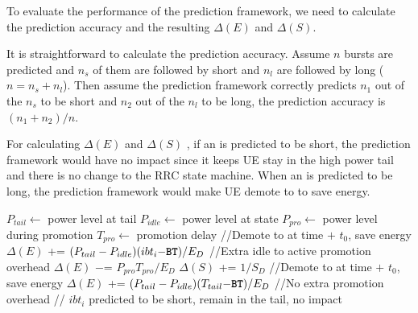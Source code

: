 \label{sec:method.eval}


To evaluate the performance of the prediction framework, we need to calculate the prediction accuracy and the resulting $\Delta(E)$ and $\Delta(S)$.

It is straightforward to calculate the prediction accuracy. Assume $n$ bursts are predicted and $n_{s}$ of them are followed by short \IBTS and $n_{l}$ are followed by long \IBTS ($n = n_{s} + n_{l}$). Then assume the prediction framework correctly predicts $n_{1}$ out of the $n_{s}$ \IBTS to be short and $n_{2}$ out of the $n_{l}$ \IBTS to be long, the prediction accuracy is $(n_{1} + n_{2}) / n$.

For calculating $\Delta(E)$ and $\Delta(S)$ , if an \IBT is predicted to be short, the prediction framework would have no impact since it keeps UE stay in the high power tail and there is no change to the RRC state machine. When an \IBT is predicted to be long, the prediction framework would make UE demote to \RI to save energy.

\begin{algorithm}[t]
\begin{algorithmic}
\STATE $P_{tail} \leftarrow $ power level at \RC tail
\STATE $P_{idle} \leftarrow $ power level at \RI state
\STATE $P_{pro} \leftarrow $ power level during promotion
\STATE $T_{pro} \leftarrow $ promotion delay
\STATE //Demote to \RI at time \BT $+$ $t_{0}$, save energy
\STATE $\Delta(E) $ += $(P_{tail} - P_{idle}) (ibt_{i} - \BT) / E_{D}$
\STATE //Extra idle to active promotion overhead
\STATE $\Delta(E) $ $-$= $P_{pro} T_{pro} / E_{D}$
\STATE $\Delta(S) $ += $1 / S_{D}$
\ELSE
\STATE //Demote to \RI at time \BT$+$ $t_{0}$, save energy
\STATE $\Delta(E) $ += $(P_{tail} - P_{idle}) (T_{tail} - \BT) / E_{D}$
\STATE //No extra promotion overhead
\ENDIF
\ELSE
\STATE // $ibt_{i}$ predicted to be short, remain in the tail, no impact
\ENDIF
\end{algorithmic}
\label{algo:update}
\end{algorithm}



